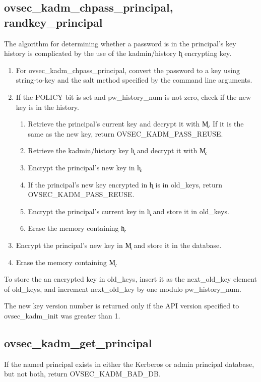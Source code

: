 \subsection{ovsec_kadm_chpass_principal, randkey_principal}

The algorithm for determining whether a password is in the principal's
key history is complicated by the use of the kadmin/history \k{h}
encrypting key.  

\begin{enumerate}
\item For ovsec_kadm_chpass_principal, convert the password to a key
using string-to-key and the salt method specified by the command line
arguments.

\item If the POLICY bit is set and pw_history_num is not zero, check
if the new key is in the history.
\begin{enumerate}
\item Retrieve the principal's current key and decrypt it with \k{M}.
If it is the same as the new key, return OVSEC_KADM_PASS_REUSE.
\item Retrieve the kadmin/history key \k{h} and decrypt it with \k{M}.
\item Encrypt the principal's new key in \k{h}.
\item If the principal's new key encrypted in \k{h} is in old_keys,
return OVSEC_KADM_PASS_REUSE.
\item Encrypt the principal's current key in \k{h} and store it in
old_keys.
\item Erase the memory containing \k{h}.
\end{enumerate}

\item Encrypt the principal's new key in \k{M} and store it in the
database.
\item Erase the memory containing \k{M}.
\end{enumerate}

To store the an encrypted key in old_keys, insert it as the
next_old_key element of old_keys, and increment next_old_key by one
modulo pw_history_num.

The new key version number is returned only if the API version
specified to ovsec_kadm_init was greater than 1.

\subsection{ovsec_kadm_get_principal}

If the named principal exists in either the Kerberos or admin
principal database, but not both, return OVSEC_KADM_BAD_DB.


